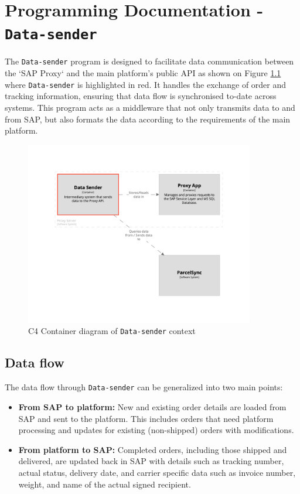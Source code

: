 \chapter{Programming Documentation - \texttt{Data-sender}}
\label{attachments:programming-data-sender}

The \texttt{Data-sender} program is designed to facilitate data communication between the `SAP Proxy` and the main platform's public API as shown on Figure \ref{imgdocs:structurizr:data_sender} where \texttt{Data-sender} is highlighted in red.
It handles the exchange of order and tracking information, ensuring that data flow is synchronised to-date across systems.
This program acts as a middleware that not only transmits data to and from SAP, but also formats the data according to the requirements of the main platform.

\begin{figure}[H]\centering
\includegraphics[width=100mm]{img/docs/fig_data_sender.png}
\caption{C4 Container diagram of \texttt{Data-sender} context}
\label{imgdocs:structurizr:data_sender}
\end{figure}

\section{Data flow}

The data flow through \texttt{Data-sender} can be generalized into two main points:
\begin{itemize}
    \item \textbf{From SAP to platform:} New and existing order details are loaded from SAP and sent to the platform. This includes orders that need platform processing and updates for existing (non-shipped) orders with modifications.
    \item \textbf{From platform to SAP:} Completed orders, including those shipped and delivered, are updated back in SAP with details such as tracking number, actual status, delivery date, and carrier specific data such as invoice number, weight, and name of the actual signed recipient.
\end{itemize}

